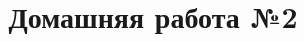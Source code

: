 \newpage
\title{Домашняя работа №2}
\begin{listofex}
	\item {}
	\item {}
	\item {}
	\item {}
	\item {}
	\item {}
	\item {}
	\item {}
\end{listofex}
%
%
%
%
